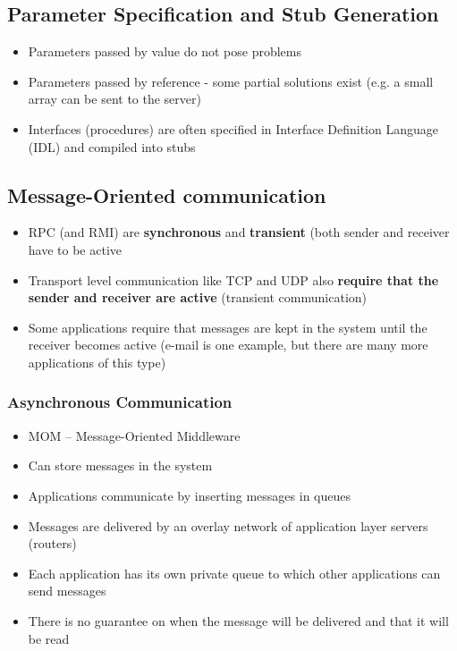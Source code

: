\subsection{Parameter Specification and Stub Generation}
\begin{itemize}
	\item Parameters passed by value do not pose problems
	\item Parameters passed by reference - some partial solutions exist (e.g. a small array can be sent to the server)
	\item Interfaces (procedures) are often specified in Interface Definition Language (IDL) and compiled into stubs	
\end{itemize}

\subsection{Message-Oriented communication}
\begin{itemize}
	\item RPC (and RMI) are \textbf{synchronous} and \textbf{transient} (both sender and receiver have to be active
	\item Transport level communication like TCP and UDP also \textbf{require that the sender and receiver are active} (transient communication)
	\item Some applications require that messages are kept in the system until the receiver becomes active (e-mail is one example, but there are many more applications of this type)	
\end{itemize}
\subsubsection{Asynchronous Communication}
\begin{itemize}
	\item MOM -- Message-Oriented Middleware
	\item Can store messages in the system
	\item Applications communicate by inserting messages in queues
	\item Messages are delivered by an overlay network of application layer servers (routers)
	\item Each application has its own private queue to which other applications can send messages
	\item There is no guarantee on when the message will be delivered and that it will be read	
\end{itemize}

